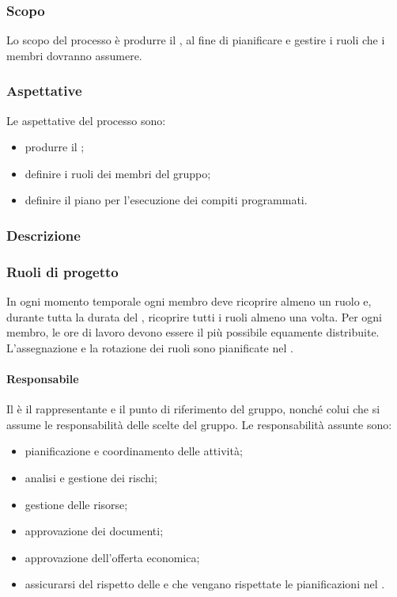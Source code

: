 \subsubsection{Scopo}
Lo scopo del processo è produrre il \PPdoc , al fine di pianificare e gestire i ruoli che i membri dovranno assumere.
\subsubsection{Aspettative}
Le aspettative del processo sono:
 \begin{itemize}
  \item produrre il \PPdoc ;
  \item definire i ruoli dei membri del gruppo;
  \item definire il piano per l'esecuzione dei compiti programmati.
 \end{itemize}
\subsubsection{Descrizione}
 
\subsubsection{Ruoli di progetto}
 In ogni momento temporale ogni membro deve ricoprire almeno un ruolo e, durante tutta la durata del , ricoprire tutti i ruoli almeno una volta. Per ogni membro, le ore di lavoro devono essere il più possibile equamente distribuite. L'assegnazione e la rotazione dei ruoli sono pianificate nel \PPdocRR.
 \paragraph{Responsabile}
 Il \RESP{} è il rappresentante e il punto di riferimento del gruppo, nonché colui che si assume le responsabilità delle scelte del gruppo.
 Le responsabilità assunte sono:
 \begin{itemize}
  \item pianificazione e coordinamento delle attività;
  \item analisi e gestione dei rischi;
  \item gestione delle risorse;
  \item approvazione dei documenti;
  \item approvazione dell'offerta economica;
  \item assicurarsi del rispetto delle \NPdoc{} e che vengano rispettate le pianificazioni nel \PPdoc.
 \end{itemize}
